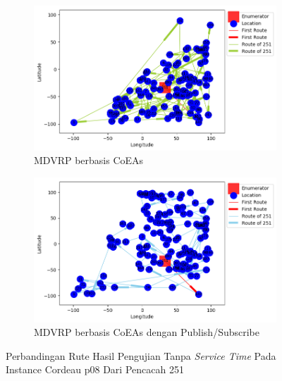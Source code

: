 \begin{figure}[H]
	\centering
	\begin{subfigure}[t]{\textwidth}
		\centering
		\includegraphics[width=\textwidth]{Resources/Images/cordeau_p08/cordeau_p08_notw_251_coes}
		\caption{MDVRP berbasis CoEAs}
		\label{fig:cordeau_p08_notw_251_coes}
	\end{subfigure}
	\begin{subfigure}[t]{\textwidth}
		\centering
		\includegraphics[width=\textwidth]{Resources/Images/cordeau_p08/cordeau_p08_notw_251_pubsub_coes}
		\caption{MDVRP berbasis CoEAs dengan Publish/Subscribe}
		\label{fig:cordeau_p08_notw_251_pubsub_coes}
	\end{subfigure}
	\caption{Perbandingan Rute Hasil Pengujian Tanpa \textit{Service Time} Pada Instance Cordeau p08 Dari Pencacah 251}
	\label{fig:cordeau_p08_notw_251}
\end{figure}


